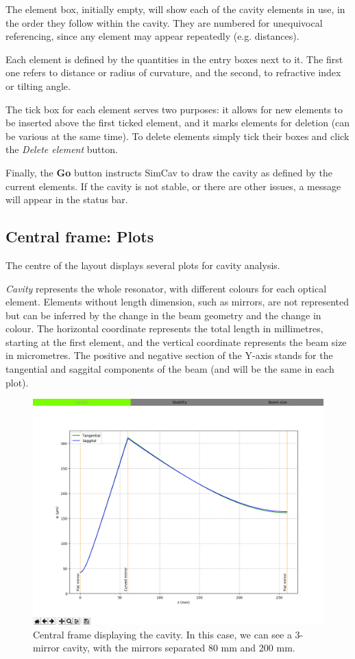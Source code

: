 \documentclass[11pt,a4paper,article,oneside]{memoir}
\begin{document}
		The element box, initially empty, will show each of the cavity elements in use, in the order they follow within the cavity. They are numbered for unequivocal referencing, since any element may appear repeatedly (e.g. distances). 
		
		Each element is defined by the quantities in the entry boxes next to it. The first one refers to distance or radius of curvature, and the second, to refractive index or tilting angle.
		
		The tick box for each element serves two purposes: it allows for new elements to be inserted above the first ticked element, and it marks elements for deletion (can be various at the same time). To delete elements simply tick their boxes and click the \textit{Delete element} button.
		
		Finally, the \textbf{Go} button instructs SimCav to draw the cavity as defined by the current elements. If the cavity is not stable, or there are other issues, a message will appear in the status bar.
		
		
		\newpage
		\subsection{Central frame: Plots}
		The centre of the layout displays several plots for cavity analysis. 
		
		\textit{Cavity} represents the whole resonator, with different colours for each optical element. Elements without length dimension, such as mirrors, are not represented but can be inferred by the change in the beam geometry and the change in colour. The horizontal coordinate represents the total length in millimetres, starting at the first element, and the vertical coordinate represents the beam size in micrometres. The positive and negative section of the Y-axis stands for the tangential and saggital components of the beam (and will be the same in each plot).
				
		\begin{figure}[h!]
			\centering
			\includegraphics[width=0.8\linewidth]{central-frame.png}
			\caption[Cavity frame]{Central frame displaying the cavity. In this case, we can see a 3-mirror cavity, with the mirrors separated 80 mm and 200 mm.}
			\label{fig:central-frame}
		\end{figure}
	
\end{document}
